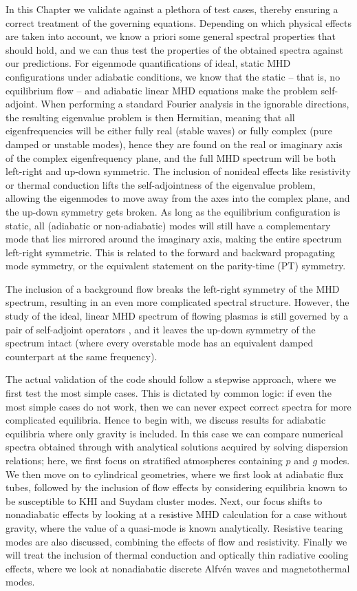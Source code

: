 In this Chapter we validate {\legolas} against a plethora of test cases, thereby ensuring a correct treatment of the governing equations. Depending on which physical effects are taken into account, we know a priori some general spectral properties that should hold, and we can thus test the properties of the obtained spectra against our predictions. For eigenmode quantifications of ideal, static MHD configurations under adiabatic conditions, we know that the static -- that is, no equilibrium flow -- and adiabatic linear MHD equations make the problem self-adjoint. When performing a standard Fourier analysis in the ignorable directions, the resulting eigenvalue problem is then Hermitian, meaning that all eigenfrequencies will be either fully real (stable waves) or fully complex (pure damped or unstable modes), hence they are found on the real or imaginary axis of the complex eigenfrequency plane, and the full MHD spectrum will be both left-right and up-down symmetric. The inclusion of nonideal effects like resistivity or thermal conduction lifts the self-adjointness of the eigenvalue problem, allowing the eigenmodes to move away from the axes into the complex plane, and the up-down symmetry gets broken. As long as the equilibrium configuration is static, all (adiabatic or non-adiabatic) modes will still have a complementary mode that lies mirrored around the imaginary axis, making the entire spectrum left-right symmetric. This is related to the forward and backward propagating mode symmetry, or the equivalent statement on the parity-time (PT) symmetry.

The inclusion of a background flow breaks the left-right symmetry of the MHD spectrum, resulting in an even more complicated spectral structure. However, the study of the ideal, linear MHD spectrum of flowing plasmas is still governed by a pair of self-adjoint operators \citep{goedbloed2011,book_MHD}, and it leaves the up-down symmetry of the spectrum intact (where every overstable mode has an equivalent damped counterpart at the same frequency).

The actual validation of the code should follow a stepwise approach, where we first test the most simple cases. This is dictated by common logic: if even the most simple cases do not work, then we can never expect correct spectra for more complicated equilibria. Hence to begin with, we discuss results for adiabatic equilibria where only gravity is included. In this case we can compare numerical spectra obtained through {\legolas} with analytical solutions acquired by solving dispersion relations; here, we first focus on stratified atmospheres containing $p$ and $g$ modes. We then move on to cylindrical geometries, where we first look at adiabatic flux tubes, followed by the inclusion of flow effects by considering equilibria known to be susceptible to KHI and Suydam cluster modes. Next, our focus shifts to nonadiabatic effects by looking at a resistive MHD calculation for a case without gravity, where the value of a quasi-mode is known analytically. Resistive tearing modes are also discussed, combining the effects of flow and resistivity. Finally we will treat the inclusion of thermal conduction and optically thin radiative cooling effects, where we look at nonadiabatic discrete Alfv\'en waves and magnetothermal modes.


